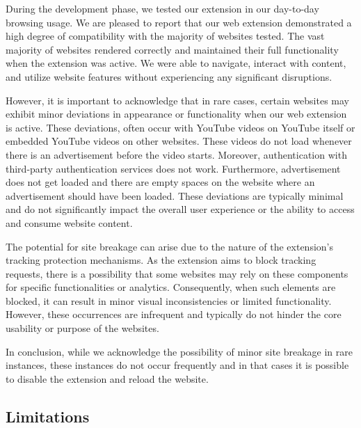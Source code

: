 During the development phase, we tested our extension in our day-to-day browsing usage. We are pleased to report that our web
extension demonstrated a high degree of compatibility with the majority of websites tested.
The vast majority of websites rendered correctly and maintained their full functionality when the extension was active. We
were able to navigate, interact with content, and utilize website features without experiencing any significant disruptions.

However, it is important to acknowledge that in rare cases, certain websites may exhibit minor deviations in appearance or
functionality when our web extension is active. These deviations, often occur with YouTube videos on YouTube itself or embedded 
YouTube videos on other websites. These videos do not load whenever there is an advertisement before the video starts. Moreover, 
authentication with third-party authentication services does not work. Furthermore, advertisement does not get loaded and there are empty 
spaces on the website where an advertisement should have been loaded. These deviations are typically minimal and do not significantly impact
the overall user experience or the ability to access and consume website content.

The potential for site breakage can arise due to the nature of the extension's tracking protection mechanisms. As the extension
aims to block tracking requests, there is a possibility that some websites may rely
on these components for specific functionalities or analytics. Consequently, when such elements are blocked, it can result in
minor visual inconsistencies or limited functionality. However, these occurrences are infrequent and typically do not hinder
the core usability or purpose of the websites.

In conclusion, while we acknowledge the possibility of minor site breakage in rare instances, these instances do not occur frequently 
and in that cases it is possible to disable the extension and reload the website.
\subsection{Limitations}

